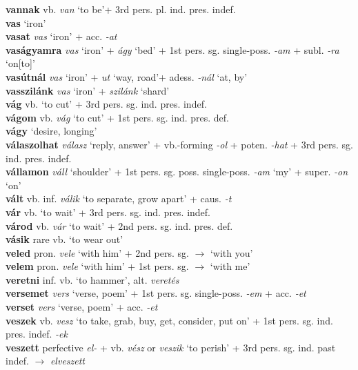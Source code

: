 \documentclass[11pt]{article}
\begin{document}
\textbf{vannak} vb. \emph{van} `to be'+ 3rd
pers. pl. ind. pres. indef. \\
\textbf{vas} `iron' \\
\textbf{vasat} \emph{vas} `iron' + acc. \emph{-at} \\
\textbf{vaságyamra} \emph{vas} `iron' + \emph{ágy} `bed' + 1st
pers. sg. single\hyp{}poss. \emph{-am} + subl. \emph{-ra} `on[to]' \\
\textbf{vasútnál} \emph{vas} `iron' + \emph{ut} `way, road'+
adess. \emph{-nál} `at, by' \\
\textbf{vasszilánk} \emph{vas} `iron' + \emph{szilánk} `shard' \\
\textbf{vág} vb. `to cut' + 3rd pers. sg. ind. pres. indef. \\
\textbf{vágom} vb. \emph{vág} `to cut' + 1st pers. sg. ind. pres. def. \\
\textbf{vágy} `desire, longing' \\
\textbf{válaszolhat} \emph{válasz} `reply, answer' +
vb.-forming \emph{-ol} + poten. \emph{-hat} + 3rd
pers. sg. ind. pres. indef. \\
\textbf{vállamon} \emph{váll} `shoulder' + 1st
pers. sg. poss. single\hyp{}poss. \emph{-am} `my' + super. \emph{-on} `on' \\
\textbf{vált} vb. inf. \emph{válik} `to separate, grow apart' +
caus. \emph{-t} \\
\textbf{vár} vb. `to wait' + 3rd pers. sg. ind. pres. indef. \\
\textbf{várod} vb. \emph{vár} `to wait' + 2nd
pers. sg. ind. pres. def. \\
\textbf{vásik} rare vb. `to wear out' \\
\textbf{veled} pron. \emph{vele} `with him' + 2nd
pers. sg. $\rightarrow$ `with you' \\
\textbf{velem} pron. \emph{vele} `with him' + 1st
pers. sg. $\rightarrow$ `with me' \\
\textbf{veretni} inf. vb. `to hammer', alt. \emph{veretés} \\
\textbf{versemet} \emph{vers} `verse, poem' + 1st pers. sg. single\hyp{}poss. \emph{-em} + acc. \emph{-et} \\
\textbf{verset} \emph{vers} `verse, poem' + acc. \emph{-et} \\
\textbf{veszek} vb. \emph{vesz} `to take, grab, buy, get, consider, put on'
  + 1st pers. sg. ind. pres. indef. \emph{-ek} \\
\textbf{veszett} perfective \emph{el-} + vb. \emph{vész}
or \emph{veszik} `to perish' + 3rd pers. sg. ind. past indef. $\rightarrow$ \emph{elveszett} \\
\end{document}
